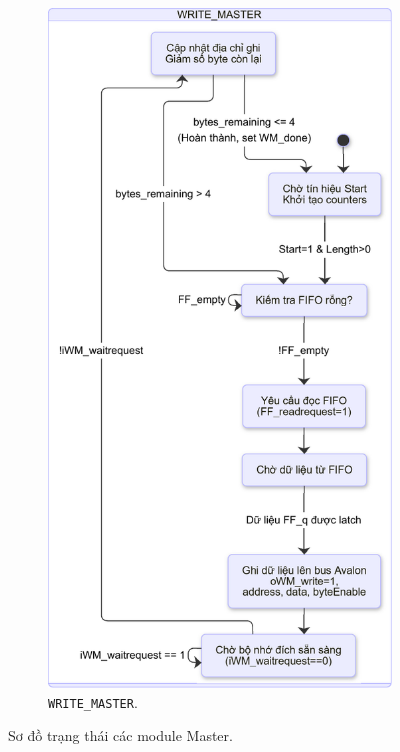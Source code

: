 \begin{figure}[htbp]
    \begin{subfigure}[b]{0.49\textwidth}
        \centering
        \includegraphics[width=\linewidth]{Images/02_13_StateDiagram_WriteMaster.pdf}
        \caption{\texttt{WRITE\_MASTER}.}
        \label{fig:02_13_StateDiagram_WriteMaster}
    \end{subfigure}
    \caption{Sơ đồ trạng thái các module Master.} %
    \label{fig:StateDiagram_ReadWriteMaster} 
\end{figure}

